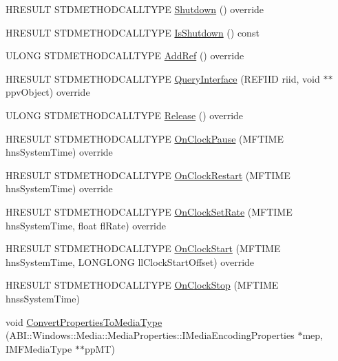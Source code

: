 \begin{DoxyCompactItemize}
H\+R\+E\+S\+U\+LT S\+T\+D\+M\+E\+T\+H\+O\+D\+C\+A\+L\+L\+T\+Y\+PE \hyperlink{class_custom_media_sink_a10a0983b729b81aeeaaed85ef62790cf}{Shutdown} () override
\item 
H\+R\+E\+S\+U\+LT S\+T\+D\+M\+E\+T\+H\+O\+D\+C\+A\+L\+L\+T\+Y\+PE \hyperlink{class_custom_media_sink_a7880dc8a1b1e9669e8af5e850c97dc67}{Is\+Shutdown} () const
\item 
U\+L\+O\+NG S\+T\+D\+M\+E\+T\+H\+O\+D\+C\+A\+L\+L\+T\+Y\+PE \hyperlink{class_custom_media_sink_a915bf7d17d72e4fd3ef68996a4ee0be8}{Add\+Ref} () override
\item 
H\+R\+E\+S\+U\+LT S\+T\+D\+M\+E\+T\+H\+O\+D\+C\+A\+L\+L\+T\+Y\+PE \hyperlink{class_custom_media_sink_a923f3635279efe50c434efcc96576ded}{Query\+Interface} (R\+E\+F\+I\+ID riid, void $\ast$$\ast$ppv\+Object) override
\item 
U\+L\+O\+NG S\+T\+D\+M\+E\+T\+H\+O\+D\+C\+A\+L\+L\+T\+Y\+PE \hyperlink{class_custom_media_sink_ab80330e1163b69e3f61dd60f109d0a20}{Release} () override
\item 
H\+R\+E\+S\+U\+LT S\+T\+D\+M\+E\+T\+H\+O\+D\+C\+A\+L\+L\+T\+Y\+PE \hyperlink{class_custom_media_sink_a274a42b131c88275613758ea79065228}{On\+Clock\+Pause} (M\+F\+T\+I\+ME hns\+System\+Time) override
\item 
H\+R\+E\+S\+U\+LT S\+T\+D\+M\+E\+T\+H\+O\+D\+C\+A\+L\+L\+T\+Y\+PE \hyperlink{class_custom_media_sink_a1daa26f0504f867251c00a34ec84d96b}{On\+Clock\+Restart} (M\+F\+T\+I\+ME hns\+System\+Time) override
\item 
H\+R\+E\+S\+U\+LT S\+T\+D\+M\+E\+T\+H\+O\+D\+C\+A\+L\+L\+T\+Y\+PE \hyperlink{class_custom_media_sink_a25f16e92bd5f490f49f5cb9cf5d566e3}{On\+Clock\+Set\+Rate} (M\+F\+T\+I\+ME hns\+System\+Time, float fl\+Rate) override
\item 
H\+R\+E\+S\+U\+LT S\+T\+D\+M\+E\+T\+H\+O\+D\+C\+A\+L\+L\+T\+Y\+PE \hyperlink{class_custom_media_sink_a56227be87e465484d3fa76f4411bff72}{On\+Clock\+Start} (M\+F\+T\+I\+ME hns\+System\+Time, L\+O\+N\+G\+L\+O\+NG ll\+Clock\+Start\+Offset) override
\item 
H\+R\+E\+S\+U\+LT S\+T\+D\+M\+E\+T\+H\+O\+D\+C\+A\+L\+L\+T\+Y\+PE \hyperlink{class_custom_media_sink_aaae2ae429494b4c930c4214fee39eb42}{On\+Clock\+Stop} (M\+F\+T\+I\+ME hnss\+System\+Time)
\item 
void \hyperlink{class_custom_media_sink_a18b75362a764a1a4c110d8275f4f88c7}{Convert\+Properties\+To\+Media\+Type} (A\+B\+I\+::\+Windows\+::\+Media\+::\+Media\+Properties\+::\+I\+Media\+Encoding\+Properties $\ast$mep, I\+M\+F\+Media\+Type $\ast$$\ast$pp\+MT)
\end{DoxyCompactItemize}

